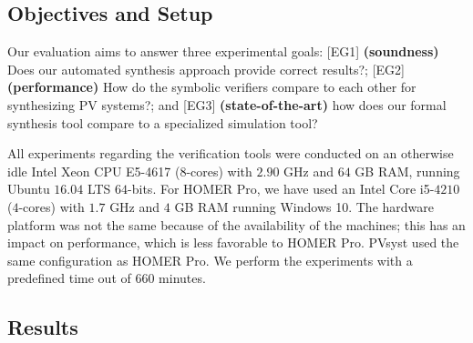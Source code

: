 \documentclass[runningheads]{llncs}
\begin{document}
\subsection{Objectives and Setup}

Our evaluation aims to answer three experimental goals: [EG1] \textbf{(soundness)} Does our automated synthesis approach provide correct results?; [EG2] \textbf{(performance)} How do the symbolic verifiers compare to each other for synthesizing PV systems?; and [EG3] \textbf{(state-of-the-art)} how does our formal synthesis tool compare to a specialized simulation tool?

All experiments regarding the verification tools were conducted on an otherwise idle Intel Xeon CPU E5-4617 ($8$-cores) with $2.90$ GHz and $64$ GB RAM, running Ubuntu $16.04$ LTS $64$-bits. For HOMER Pro, we have used an Intel Core i5-$4210$ ($4$-cores) with $1.7$ GHz and $4$ GB RAM running Windows 10. The hardware platform was not the same because of the availability of the machines; this has an impact on performance, which is less favorable to HOMER Pro. PVsyst used the same configuration as HOMER Pro. We perform the experiments with a predefined time out of $660$ minutes.

\subsection{Results}
\end{document}

